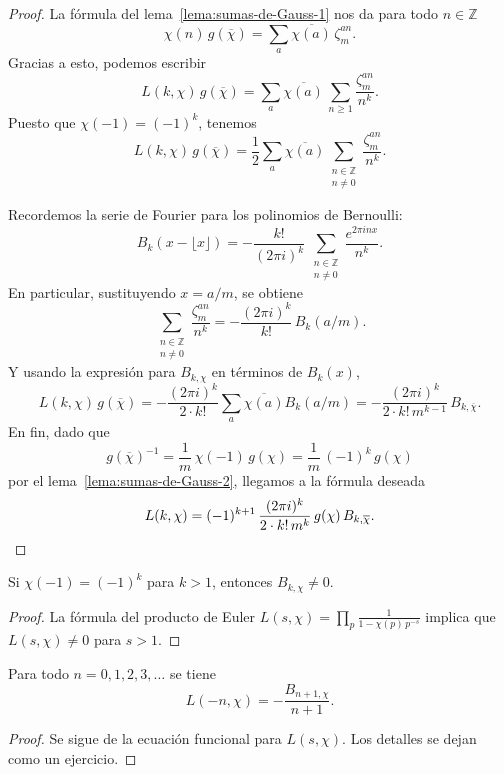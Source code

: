\begin{proof}
  La fórmula del lema~\ref{lema:sumas-de-Gauss-1} nos da para todo
  $n \in \mathbb{Z}$
  \[ \chi (n)\,g (\overline{\chi}) =
     \sum_a \overline{\chi (a)}\,\zeta^{an}_m. \]
  Gracias a esto, podemos escribir
  \[ L (k,\chi)\,g (\overline{\chi}) =
     \sum_a \overline{\chi (a)} \, \sum_{n\ge 1} \frac{\zeta_m^{an}}{n^k}. \]
  Puesto que $\chi (-1) = (-1)^k$, tenemos
  \[ L (k,\chi)\,g (\overline{\chi}) =
     \frac{1}{2} \sum_a \overline{\chi (a)} \sum_{\substack{n \in \mathbb{Z} \\ n \ne 0}} \frac{\zeta_m^{an}}{n^k}. \]

  Recordemos la serie de Fourier para los polinomios de Bernoulli:
  \[ B_k (x - \lfloor x\rfloor) =
     -\frac{k!}{(2\pi i)^k} \, \sum_{\substack{n \in \mathbb{Z} \\ n \ne 0}} \frac{e^{2\pi i n x}}{n^k}. \]
  En particular, sustituyendo $x = a/m$, se obtiene
  \[ \sum_{\substack{n \in \mathbb{Z} \\ n \ne 0}} \frac{\zeta_m^{an}}{n^k} =
     -\frac{(2\pi i)^k}{k!}\,B_k (a/m). \]
  Y usando la expresión para $B_{k,\chi}$ en términos de $B_k (x)$,
  \[ L (k,\chi)\,g (\overline{\chi}) =
     -\frac{(2\pi i)^k}{2\cdot k!} \sum_a \overline{\chi (a)} B_k (a/m) =
     -\frac{(2\pi i)^k}{2\cdot k!\,m^{k-1}}\,B_{k,\overline{\chi}}. \]
  En fin, dado que
  \[ g (\overline{\chi})^{-1} =
     \frac{1}{m}\,\chi (-1)\,g (\chi) =
     \frac{1}{m}\,(-1)^k\,g (\chi)\]
  por el lema~\ref{lema:sumas-de-Gauss-2}, llegamos a la fórmula deseada
  \[ L (k,\chi) = (-1)^{k+1}\,\frac{(2\pi i)^k}{2\cdot k!\,m^k}\,g (\chi)\,B_{k,\overline{\chi}}. \qedhere \]
\end{proof}

\begin{corolario}
  Si $\chi (-1) = (-1)^k$ para $k > 1$, entonces $B_{k,\chi} \ne 0$.

  \begin{proof}
    La fórmula del producto de Euler
    $L (s,\chi) = \prod_p \frac{1}{1 - \chi (p)\,p^{-s}}$
    implica que $L (s,\chi) \ne 0$ para ${s > 1}$.
  \end{proof}
\end{corolario}

\begin{corolario}
  Para todo $n = 0,1,2,3,\ldots$ se tiene
  $$L (-n,\chi) = -\frac{B_{n+1,\chi}}{n+1}.$$

  \begin{proof}
    Se sigue de la ecuación funcional para $L (s,\chi)$. Los detalles se dejan
    como un ejercicio.
  \end{proof}
\end{corolario}

